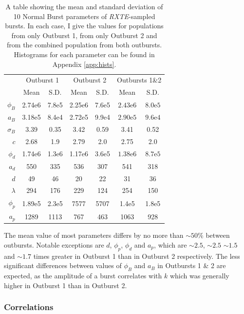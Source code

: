 \begin{table}
\centering
\begin{tabular}{r c c c c c c}
\hline
\hline
 & \multicolumn{2}{c}{\scriptsize Outburst 1} & \multicolumn{2}{c}{\scriptsize Outburst 2} & \multicolumn{2}{c}{\scriptsize Outbursts 1\&2}  \\
 &Mean&S.D.&Mean&S.D.&Mean&S.D.\\
\hline
$\phi_B$&2.74e6&7.8e5&2.25e6&7.6e5&$2.43\mathrm{e}6$&$8.0\mathrm{e}5$\\
$a_B$&3.18e5&8.4e4&2.72e5&9.9e4&$2.90\mathrm{e}5$&$9.6\mathrm{e}4$\\
$\sigma_B$&3.39&0.35&3.42&0.59&3.41&0.52\\
$c$&2.68&1.9&2.79&2.0&2.75&2.0\\
$\phi_d$&1.74e6&1.3e6&1.17e6&3.6e5&$1.38\mathrm{e}6$&$8.7\mathrm{e}5$\\
$a_d$&550&335&536&307&541&318\\
$d$&49&46&20&22&31&36\\
$\lambda$&294&176&229&124&254&150\\
$\phi_p$&1.89e5&2.3e5&7577&5707&1.4e5&1.8e5\\
$a_p$&1289&1113&767&463&1063&928\\
\hline
\hline
\end{tabular}
\caption[A table showing the mean and standard deviation of 10 Normal Burst parameters of \textit{RXTE}-sampled bursts.]{A table showing the mean and standard deviation of 10 Normal Burst parameters of \textit{RXTE}-sampled bursts.  In each case, I give the values for populations from only Outburst 1, from only Outburst 2 and from the combined population from both outbursts.  Histograms for each parameter can be found in Appendix \ref{app:hists}.}
\label{tab:params_perob}
\end{table}

\par The mean value of most parameters differs by no more than $\sim50$\% between outbursts.  Notable exceptions are $d$, $\phi_p$, $\phi_d$ and $a_p$, which are $\sim2.5$, $\sim2.5$ $\sim1.5$ and $\sim1.7$ times greater in Outburst 1 than in Outburst 2 respectively.  The less significant differences between values of $\phi_B$ and $a_B$ in Outbursts 1 \& 2 are expected, as the amplitude of a burst correlates with $k$ which was generally higher in Outburst 1 than in Outburst 2.

\subsubsection{Correlations}

